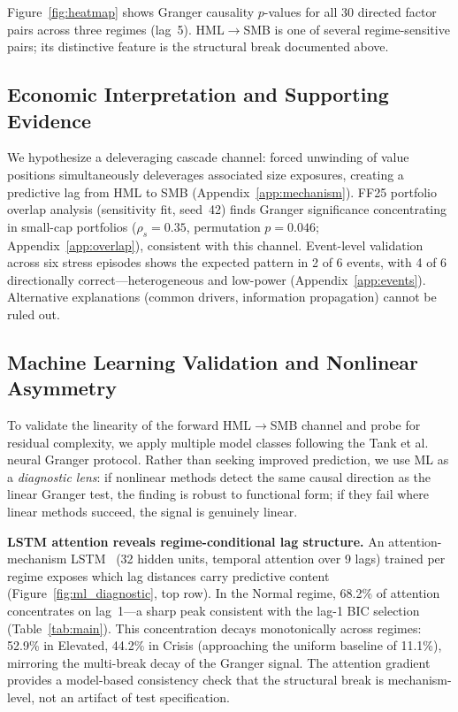 \documentclass[sigconf,anonymous]{acmart}
\begin{document}
Figure~\ref{fig:heatmap} shows Granger causality $p$-values for all 30
directed factor pairs across three regimes (lag~5). HML$\to$SMB is one of
several regime-sensitive pairs; its distinctive feature is the structural
break documented above.

\subsection{Economic Interpretation and Supporting Evidence}
\label{sec:interpretation}
\label{sec:overlap_evidence}
\label{sec:oos}
We hypothesize a deleveraging cascade channel: forced unwinding of value positions
simultaneously deleverages associated size exposures, creating a predictive lag from
HML to SMB (Appendix~\ref{app:mechanism}). FF25 portfolio overlap analysis (sensitivity
fit, seed~42) finds Granger significance concentrating in small-cap portfolios
($\rho_s = 0.35$, permutation $p = 0.046$; Appendix~\ref{app:overlap}), consistent
with this channel. Event-level validation across six stress episodes shows the expected
pattern in 2 of 6 events, with 4 of 6 directionally correct---heterogeneous and low-power
(Appendix~\ref{app:events}).
Alternative explanations (common drivers, information propagation) cannot be ruled out.

\subsection{Machine Learning Validation and Nonlinear Asymmetry}
\label{sec:ml_validation}

To validate the linearity of the forward HML$\to$SMB channel and probe for
residual complexity, we apply multiple model classes following the
Tank et al.~\cite{tank2022neural} neural Granger protocol.
Rather than seeking improved prediction, we use ML as a \emph{diagnostic
lens}: if nonlinear methods detect the same causal direction as the
linear Granger test, the finding is robust to functional form;
if they fail where linear methods succeed, the signal is genuinely linear.

\textbf{LSTM attention reveals regime-conditional lag structure.}
An attention-mechanism LSTM~\cite{tank2022neural} (32 hidden units,
temporal attention over 9 lags) trained per regime exposes which lag
distances carry predictive content (Figure~\ref{fig:ml_diagnostic},
top row). In the Normal regime, 68.2\% of attention concentrates on
lag~1---a sharp peak consistent with the lag-1 BIC selection
(Table~\ref{tab:main}). This concentration decays monotonically across
regimes: 52.9\% in Elevated, 44.2\% in Crisis (approaching the uniform
baseline of 11.1\%), mirroring the multi-break decay of the Granger
signal. The attention gradient provides a model-based consistency check that
the structural break is mechanism-level, not an artifact of test specification.
\end{document}
